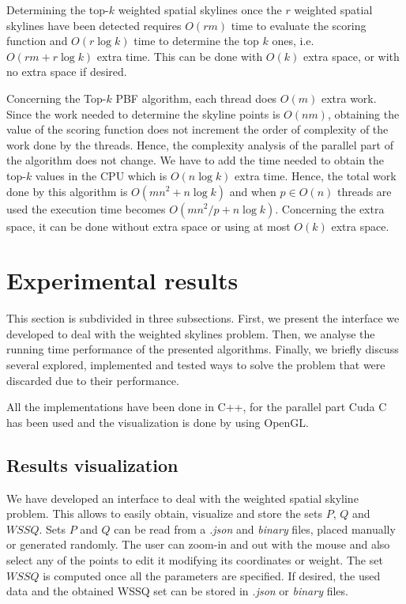 \documentclass[11pt,onecolumn]{elsart3p}
\begin{document}
         Determining the top-$k$ weighted spatial skylines once the $r$ weighted spatial skylines have been detected requires $O(rm)$ time to evaluate the scoring function and $O(r\log k)$ time to determine the top $k$ ones, i.e. $O(rm + r\log k)$ extra time. This can be done with $O(k)$ extra space, or with no extra space if desired.

        Concerning the Top-$k$ PBF algorithm, each thread does $O(m)$ extra work. Since the work needed to determine the skyline points is $O(nm)$, obtaining the value of the scoring function does not increment the order of complexity of the work done by the threads. Hence, the complexity analysis of the parallel part of the algorithm does not change. We have to add the time needed to obtain the top-$k$ values in the CPU which is $O(n\log k)$ extra time. Hence, the total work done by this algorithm is $O(mn^2+n\log k)$ and when $p\in O(n)$ threads are used the execution time becomes $O(mn^2/p+n\log k)$.  Concerning the extra space, it can be done without extra space or using at most $O(k)$ extra space.

\section{Experimental results}\label{sec:ExpResults}

This section is subdivided in three subsections. First, we present the interface we developed to deal with the weighted skylines problem. Then, we analyse the running time performance of the presented algorithms. Finally, we briefly discuss several explored, implemented and tested ways to solve the problem that were discarded due to their performance.

All the implementations have been done in C++, for the parallel part Cuda C has been used and the visualization is done by using OpenGL.


\subsection{Results visualization}
 We have developed an interface to deal with the weighted spatial skyline problem. This allows to easily obtain, visualize and store the sets $P$, $Q$ and $WSSQ$. Sets $P$ and $Q$ can be read from a {\it .json} and {\it binary} files, placed manually or generated randomly. The user can zoom-in and out with the mouse and also select any of the points to edit it modifying its coordinates or weight. The set $WSSQ$ is computed once all the parameters are specified. If desired, the used data and the obtained WSSQ set can be stored in {\it .json} or {\it binary} files.
\end{document}
